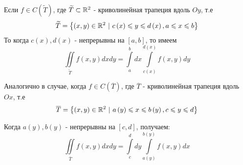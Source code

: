 \documentclass[../../main.tex]{subfiles}
\begin{document}
\begin{crl}
	Если $ f \in C \left( \widetilde{T} \right) $, 
	где $ \widetilde{T} \subset \mathbb{R}^2 $ - 
	криволинейная трапеция вдоль $ Oy $, т.е 
	\begin{equation}
	\label{lec_13, num_19}
	\widetilde{T} = \left\lbrace 
	\left( x, y\right) \in \mathbb{R}^2\ | 
	\ c \left( x \right) \leqslant y \leqslant d \left( x \right),
	 a \leqslant x \leqslant b \right\rbrace
	 \end{equation}
	 То когда $c \left( x \right), d \left( x \right) $ - непрерывны на 
	 $ \left[ a, b \right] $, то имеем
	 \begin{equation}
	 \label{lec_13, num_20}
	 \iint\limits_{\widetilde{T}} f \left( x, y \right)  dxdy = 
	 \int\limits_a^b dx \int\limits_{c \left( x \right) }^{d \left( x \right)} 
	 f \left( x, y \right) dy
	 \end{equation}
	 
	 Аналогично в случае, когда $ f \in C \left( \overline{T} \right) $, 
	 где $ \overline{T} $ - криволинейная трапеция вдоль $ Ox $, т.е 
	 \begin{equation}
	 \label{lec_13, num_21}
	 \overline{T} = \left\lbrace 
	 \left( x, y\right) \in \mathbb{R}^2\ | 
	 \ a \left( y \right) \leqslant x \leqslant b \left( y \right),
	 c \leqslant y \leqslant d \right\rbrace
	 \end{equation}
	 
	 Когда $ a \left( y \right), b \left( y \right) $
	  - непрерывны на $ \left[ c, d \right] $, получаем:
	 \begin{equation}
	 \label{lec_13, num_22}
	 \iint\limits_{\overline{T}} f \left( x, y \right) dx dy = 
	 \int\limits_c^d dy 
	 \int\limits_{a \left( y \right) } ^ 
	 {b \left( y \right) } f \left( x, y \right) dx
	 \end{equation}
\end{crl}
\end{document}
